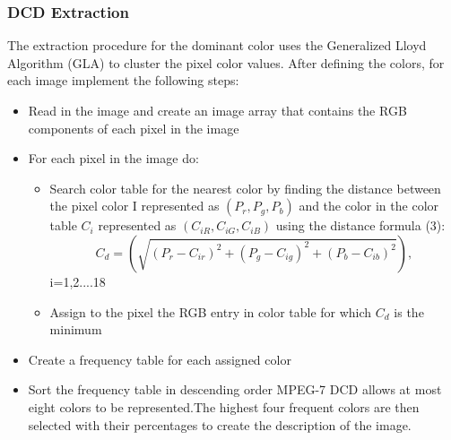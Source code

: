 \subsubsection{DCD Extraction}
The  extraction  procedure  for  the dominant  color  uses  the Generalized Lloyd Algorithm (GLA)\cite{vector}  to  cluster  the  pixel  color  values. After  defining  the  colors,  for  each  image implement the following steps:
\begin{itemize}
\item Read  in  the  image  and  create  an  image  array  that 
contains  the RGB components of each pixel  in  the 
image
\item For each pixel in the image do: 
	\begin{itemize}
	\item Search  color  table  for  the  nearest  color  by finding  the distance between  the pixel  color  I 
		represented as  $(P_{r}, P_{g}, P_{b})$ and  the color  in  the color  table $ C_{i}$  represented  as 
		$(C_{iR},  C_{iG},  C_{iB})$ using the distance formula (3): 
		\[  C_{d}=(\sqrt{(P_{r}-C_{ir})^2 + (P_{g}-C_{ig})^2 + (P_{b}-C_{ib})^2}), \]
                        \qquad  i=1,2....18
	\item Assign  to  the  pixel  the  RGB  entry  in  color table for which $C_{d}$ is the minimum
	\end{itemize}
\item Create a frequency table for each assigned color 
\item Sort  the  frequency  table  in  descending  order MPEG-7  DCD  allows  at  most  eight  colors  to  be 
	represented.The  highest  four  frequent colors  are  then  selected  with  their  percentages  to 
	create the description of the image.
\end{itemize}


